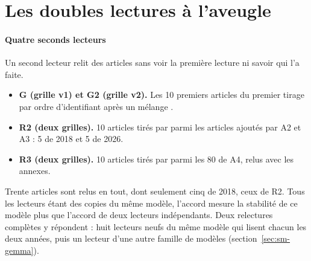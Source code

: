 \section{Les doubles lectures à l'aveugle}\label{sec:sm-doubles}

\paragraph{Quatre seconds lecteurs}
Un second lecteur relit des articles sans voir la première lecture ni savoir qui l'a faite.
\begin{itemize}
  \item \textbf{G (grille v1) et G2 (grille v2).} Les 10 premiers articles du premier tirage par ordre
  d'identifiant après un mélange .
  \item \textbf{R2 (deux grilles).} 10 articles tirés par  parmi les articles
  ajoutés par A2 et A3 : 5 de 2018 et 5 de 2026.
  \item \textbf{R3 (deux grilles).} 10 articles tirés par  parmi les 80 de
  A4, relus avec les annexes.
\end{itemize}
Trente articles sont relus en tout, dont seulement cinq de 2018, ceux de R2. Tous les lecteurs étant
des copies du même modèle, l'accord mesure la stabilité de ce modèle plus que l'accord de deux lecteurs
indépendants. Deux relectures complètes y répondent : huit lecteurs neufs du même modèle qui lisent
chacun les deux années, puis un lecteur d'une autre famille de modèles (section~\ref{sec:sm-gemma}).

